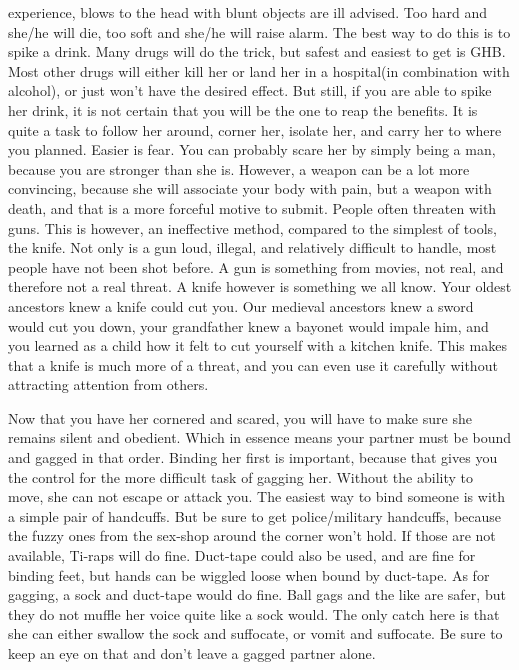 experience, blows to the head with blunt objects are ill advised. Too hard and 
she/he will die, too soft and she/he will raise alarm. The best way to do this 
is to spike a drink. Many drugs will do the trick, but safest and easiest to get 
is GHB. Most other drugs will either kill her or land her in a hospital(in 
combination with alcohol), or just won't have the desired effect. But still, if 
you are able to spike her drink, it is not certain that you will be the one to 
reap the benefits. It is quite a task to follow her around, corner her, isolate 
her, and carry her to where you planned. Easier is fear. You can probably scare 
her by simply being a man, because you are stronger than she is. However, a 
weapon can be a lot more convincing, because she will associate your body with 
pain, but a weapon with death, and that is a more forceful motive to submit. 
People often threaten with guns. This is however, an ineffective method, 
compared to the simplest of tools, the knife. Not only is a gun loud, illegal, 
and relatively difficult to handle, most people have not been shot before. A gun 
is something from movies, not real, and therefore not a real threat. A knife 
however is something we all know. Your oldest ancestors knew a knife could cut 
you. Our medieval ancestors knew a sword would cut you down, your grandfather 
knew a bayonet would impale him, and you learned as a child how it felt to cut 
yourself with a kitchen knife. This makes that a knife is much more of a threat, 
and you can even use it carefully without attracting attention from others.


Now that you have her cornered and scared, you will have to make sure she 
remains silent and obedient. Which in essence means your partner must be bound 
and gagged in that order. Binding her first is important, because that gives you 
the control for the more difficult task of gagging her. Without the ability to 
move, she can not escape or attack you. The easiest way to bind someone is with 
a simple pair of handcuffs. But be sure to get police/military handcuffs, 
because the fuzzy ones from the sex-shop around the corner won't hold. If those 
are not available, Ti-raps will do fine. Duct-tape could also be used, and are 
fine for binding feet, but hands can be wiggled loose when bound by duct-tape. 
As for gagging, a sock and duct-tape would do fine. Ball gags and the like are 
safer, but they do not muffle her voice quite like a sock
would. The only catch here is that she can either swallow the sock and 
suffocate, or vomit and suffocate. Be sure to keep an eye on that and don't 
leave a gagged partner alone.


